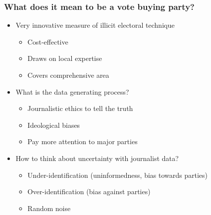 \documentclass{beamer}
\begin{document}
\begin{frame}
\frametitle{What does it mean to be a vote buying party?}

\begin{itemize}
\item Very innovative measure of illicit electoral technique
\begin{itemize}
\item Cost-effective 
\item Draws on local expertise
\item Covers comprehensive area
\end{itemize}
\item What is the data generating process?
\begin{itemize}
\item Journalistic ethics to tell the truth
\item Ideological biases
\item Pay more attention to major parties
\end{itemize}
\item How to think about uncertainty with journalist data?
\begin{itemize}
\item Under-identification (uninformedness, bias towards parties)
\item Over-identification (bias against parties)
\item Random noise
\end{itemize}
\end{itemize}
 
\end{frame}
\end{document}

